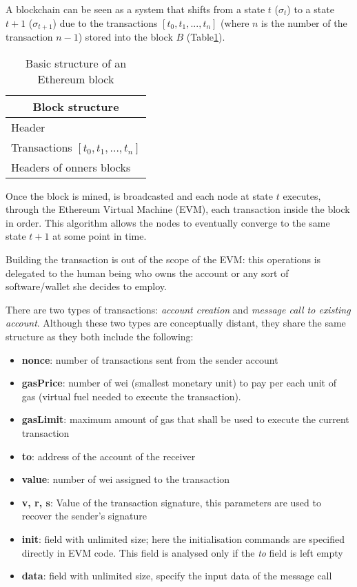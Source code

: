 A blockchain can be seen as a system that shifts from a state $t$ ($\sigma_t$) to a state $t+1$ ($\sigma_{t+1}$) due to the transactions $[t_0,t_1,...,t_n]$ (where $n$ is the number of the transaction $n-1$) stored into the block $B$ (Table\ref{table:2}).


\begin{table}[h!]
\centering
\caption{Basic structure of an Ethereum block}
\begin{tabular}{ |p{3cm}|  }
\hline
\multicolumn{1}{|c|}{Block structure} \\
\hline
\hline
Header \\
\hline
Transactions $[t_0,t_1,...,t_n]$ \\
\hline
Headers of onners blocks\\
\hline
\end{tabular}
\label{table:2}
\end{table}

Once the block is mined, is broadcasted and each node at state $t$  executes, through the Ethereum Virtual Machine (EVM), each transaction inside the block in order.
This algorithm allows the nodes to eventually converge to the same state $t+1$ at some point in time.

Building the transaction is out of the scope of the EVM: this operations is delegated to the human being who owns the account or any sort of software/wallet she decides to employ.

There are two types of transactions: \textit{account creation} and \textit{message call to existing account}. Although these two types are conceptually distant, they share the same structure as they both include the following:

\begin{itemize}
  \item \textbf{nonce}: number of transactions sent from the sender account
  \item \textbf{gasPrice}: number of wei (smallest monetary unit) to pay per each unit of gas (virtual fuel needed to execute the transaction).
  \item \textbf{gasLimit}: maximum amount of gas that shall be used to execute the current transaction
  \item \textbf{to}: address of the account of the receiver
  \item \textbf{value}: number of wei assigned to the transaction
  \item \textbf{v, r, s}: Value of the transaction signature, this parameters are used to recover the sender's signature \cite{gura2004comparing}
  \item \textbf{init}: field with unlimited size; here the initialisation commands are specified directly in EVM code. This field is analysed only if the \textit{to} field is left empty
  \item \textbf{data}: field with unlimited size, specify the input data of the message call
\end{itemize}

